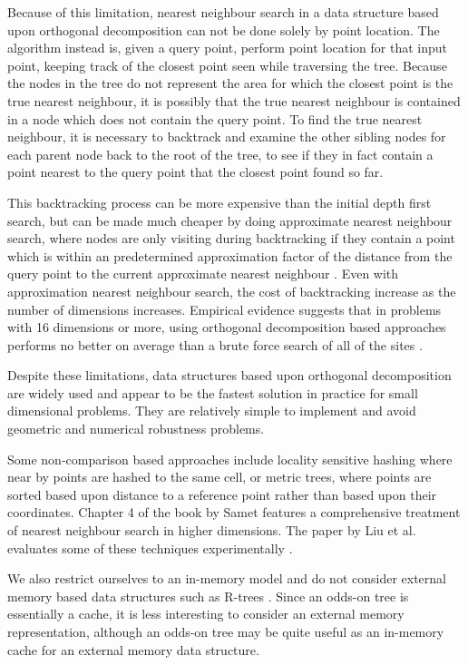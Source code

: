 \documentclass[mcs]{scsthesis}
\begin{document}
Because of this limitation, nearest neighbour search in a data structure based
upon orthogonal decomposition can not be done solely by point location. The
algorithm instead is, given a query point, perform point location for that
input point, keeping track of the closest point seen while traversing the tree.
Because the nodes in the tree do not represent the area for which the closest
point is the true nearest neighbour, it is possibly that the true nearest
neighbour is contained in a node which does not contain the query point. To
find the true nearest neighbour, it is necessary to backtrack and examine the
other sibling nodes for each parent node back to the root of the tree, to see
if they in fact contain a point nearest to the query point that the closest
point found so far.

This backtracking process can be more expensive than the initial depth first
search, but can be made much cheaper by doing approximate nearest neighbour
search, where nodes are only visiting during backtracking if they contain a
point which is within an predetermined approximation factor of the distance from
the query point to the current approximate nearest neighbour \cite{app-ann}.
Even with approximation nearest neighbour search, the cost of backtracking
increase as the number of dimensions increases. Empirical evidence suggests that
in problems with 16 dimensions or more, using orthogonal decomposition based
approaches performs no better on average than a brute force search of all of the
sites \cite{fastvector}.

Despite these limitations, data structures based upon orthogonal decomposition
are widely used and appear to be the fastest solution in practice for small
dimensional problems. They are relatively simple to implement and avoid
geometric and numerical robustness problems. 

Some non-comparison based approaches include locality sensitive hashing
\cite{lsh} where near by points are hashed to the same cell, or metric trees,
where points are sorted based upon distance to a reference point rather than
based upon their coordinates. Chapter 4 of the book by Samet \cite{samet}
features a comprehensive treatment of nearest neighbour search in higher
dimensions. The paper by Liu et al. evaluates some of these techniques
experimentally \cite{practicalann}. 

We also restrict ourselves to an in-memory model and do not consider external
memory based data structures such as R-trees \cite{rtree}. Since an odds-on tree
is essentially a cache, it is less interesting to consider an external memory
representation, although an odds-on tree may be quite useful as an in-memory
cache for an external memory data structure.
\end{document}

